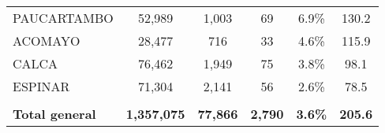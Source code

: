 \begin{tabular}{lccccc}
	\cellcolor[HTML]{FFE699}PAUCARTAMBO                             & 52,989               & 1,003                      & 69                   & 6.9\%                      & 130.2                                       \\
	\cellcolor[HTML]{FFE699}ACOMAYO                                 & 28,477               & 716                        & 33                   & 4.6\%                      & 115.9                                       \\
	\cellcolor[HTML]{FFE699}CALCA                                   & 76,462               & 1,949                      & 75                   & 3.8\%                      & 98.1                                        \\
	\cellcolor[HTML]{FFE699}ESPINAR                                 & 71,304               & 2,141                      & 56                   & 2.6\%                      & 78.5                                        \\
	& \multicolumn{1}{l}{} & \multicolumn{1}{l}{}       & \multicolumn{1}{l}{} & \multicolumn{1}{l}{}       & \multicolumn{1}{l}{}                        \\
	\rowcolor[HTML]{DDEBF7} 
	\textbf{Total general}                                          & \textbf{1,357,075}   & \textbf{77,866}            & \textbf{2,790}       & \textbf{3.6\%}             & \textbf{205.6}                             
\end{tabular}